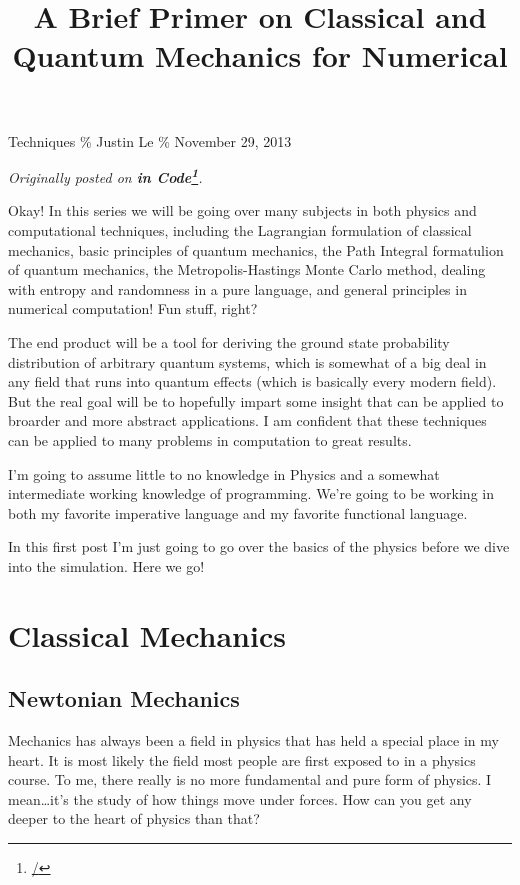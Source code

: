 \documentclass[]{article}
\title{A Brief Primer on Classical and Quantum Mechanics for Numerical}
\renewcommand{\href}[2]{#2\footnote{\url{#1}}}
\begin{document}
\maketitle

Techniques \% Justin Le \% November 29, 2013

\emph{Originally posted on \textbf{\href{/}{in Code}}.}

Okay! In this series we will be going over many subjects in both physics
and computational techniques, including the Lagrangian formulation of
classical mechanics, basic principles of quantum mechanics, the Path
Integral formatulion of quantum mechanics, the Metropolis-Hastings Monte
Carlo method, dealing with entropy and randomness in a pure language,
and general principles in numerical computation! Fun stuff, right?

The end product will be a tool for deriving the ground state probability
distribution of arbitrary quantum systems, which is somewhat of a big
deal in any field that runs into quantum effects (which is basically
every modern field). But the real goal will be to hopefully impart some
insight that can be applied to broarder and more abstract applications.
I am confident that these techniques can be applied to many problems in
computation to great results.

I'm going to assume little to no knowledge in Physics and a somewhat
intermediate working knowledge of programming. We're going to be working
in both my favorite imperative language and my favorite functional
language.

In this first post I'm just going to go over the basics of the physics
before we dive into the simulation. Here we go!

\section{Classical Mechanics}\label{classical-mechanics}

\subsection{Newtonian Mechanics}\label{newtonian-mechanics}

Mechanics has always been a field in physics that has held a special
place in my heart. It is most likely the field most people are first
exposed to in a physics course. To me, there really is no more
fundamental and pure form of physics. I mean\ldots{}it's the study of
how things move under forces. How can you get any deeper to the heart of
physics than that?
\end{document}
